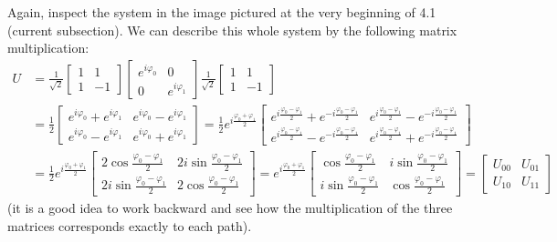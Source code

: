 \documentclass[12pt]{article}
\begin{document}
\begin{definition}
Again, inspect the system in the image pictured at the very beginning of 4.1 (current subsection). We can describe this whole system by the following matrix multiplication: $$
\begin{aligned}
\boxed{U}
    &= \frac{1}{\sqrt{2}}\begin{bmatrix}
        1 & 1\\
        1 & -1
        \end{bmatrix}\begin{bmatrix}
        e^{i\varphi_0} & 0\\
        0 & e^{i\varphi_1} 
        \end{bmatrix}\frac{1}{\sqrt{2}}\begin{bmatrix}
        1 & 1\\
        1 & -1
    \end{bmatrix}\\
    &= \frac{1}{2}\begin{bmatrix}
        e^{i\varphi_0} + e^{i\varphi_1} & e^{i\varphi_0} - e^{i\varphi_1}\\
        e^{i\varphi_0} - e^{i\varphi_1} & e^{i\varphi_0} + e^{i\varphi_1}
    \end{bmatrix} = \frac{1}{2}e^{i\frac{\varphi_0+\varphi_1}{2}}\begin{bmatrix}
        e^{i\frac{\varphi_0-\varphi_1}{2}} + e^{-i\frac{\varphi_0-\varphi_1}{2}} & e^{i\frac{\varphi_0-\varphi_1}{2}} - e^{-i\frac{\varphi_0-\varphi_1}{2}}\\
        e^{i\frac{\varphi_0-\varphi_1}{2}} - e^{-i\frac{\varphi_0-\varphi_1}{2}} & e^{i\frac{\varphi_0-\varphi_1}{2}} + e^{-i\frac{\varphi_0-\varphi_1}{2}}
    \end{bmatrix}\\
    &= \frac{1}{2}e^{i\frac{\varphi_0+\varphi_1}{2}}\begin{bmatrix}
        2\cos\frac{\varphi_0 - \varphi_1}{2} & 2i\sin\frac{\varphi_0 - \varphi_1}{2}\\
        2i\sin\frac{\varphi_0 - \varphi_1}{2} & 2\cos\frac{\varphi_0 - \varphi_1}{2}
    \end{bmatrix} = \boxed{e^{i\frac{\varphi_0+\varphi_1}{2}}\begin{bmatrix}
        \cos\frac{\varphi_0 - \varphi_1}{2} & i\sin\frac{\varphi_0 - \varphi_1}{2}\\
        i\sin\frac{\varphi_0 - \varphi_1}{2} & \cos\frac{\varphi_0 - \varphi_1}{2}
    \end{bmatrix} = \begin{bmatrix}
        U_{00} & U_{01}\\
        U_{10} & U_{11}
    \end{bmatrix}}
\end{aligned}
$$ (it is a good idea to work backward and see how the multiplication of the three matrices corresponds exactly to each path).
\end{definition}
\end{document}
